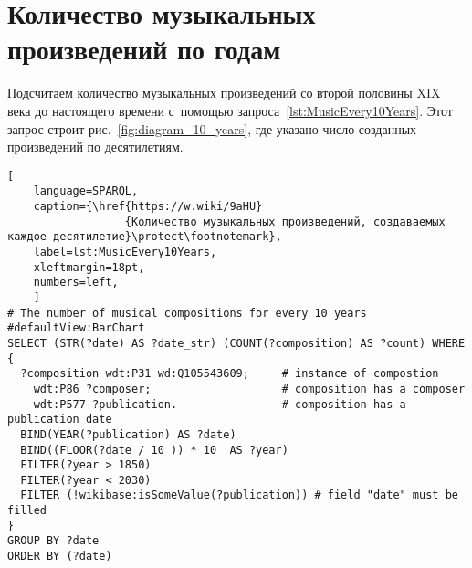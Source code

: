 






\newpage
\section{Количество музыкальных произведений по годам}

Подсчитаем количество музыкальных произведений 
со второй половины XIX века до настоящего времени 
с~помощью запроса~\ref{lst:MusicEvery10Years}. 
Этот запрос строит рис.~\ref{fig:diagram_10_years}, где 
указано число созданных произведений по десятилетиям. 


\begin{lstlisting}[ 
    language=SPARQL,
    caption={\href{https://w.wiki/9aHU}
                  {Количество музыкальных произведений, создаваемых каждое десятилетие}\protect\footnotemark},
    label=lst:MusicEvery10Years,
    xleftmargin=18pt,
    numbers=left,
    ]
# The number of musical compositions for every 10 years
#defaultView:BarChart
SELECT (STR(?date) AS ?date_str) (COUNT(?composition) AS ?count) WHERE {
  ?composition wdt:P31 wd:Q105543609;     # instance of compostion
    wdt:P86 ?composer;                    # composition has a composer
    wdt:P577 ?publication.                # composition has a publication date
  BIND(YEAR(?publication) AS ?date)
  BIND((FLOOR(?date / 10 )) * 10  AS ?year)
  FILTER(?year > 1850)
  FILTER(?year < 2030) 
  FILTER (!wikibase:isSomeValue(?publication)) # field "date" must be filled
}
GROUP BY ?date
ORDER BY (?date)
\end{lstlisting}%




